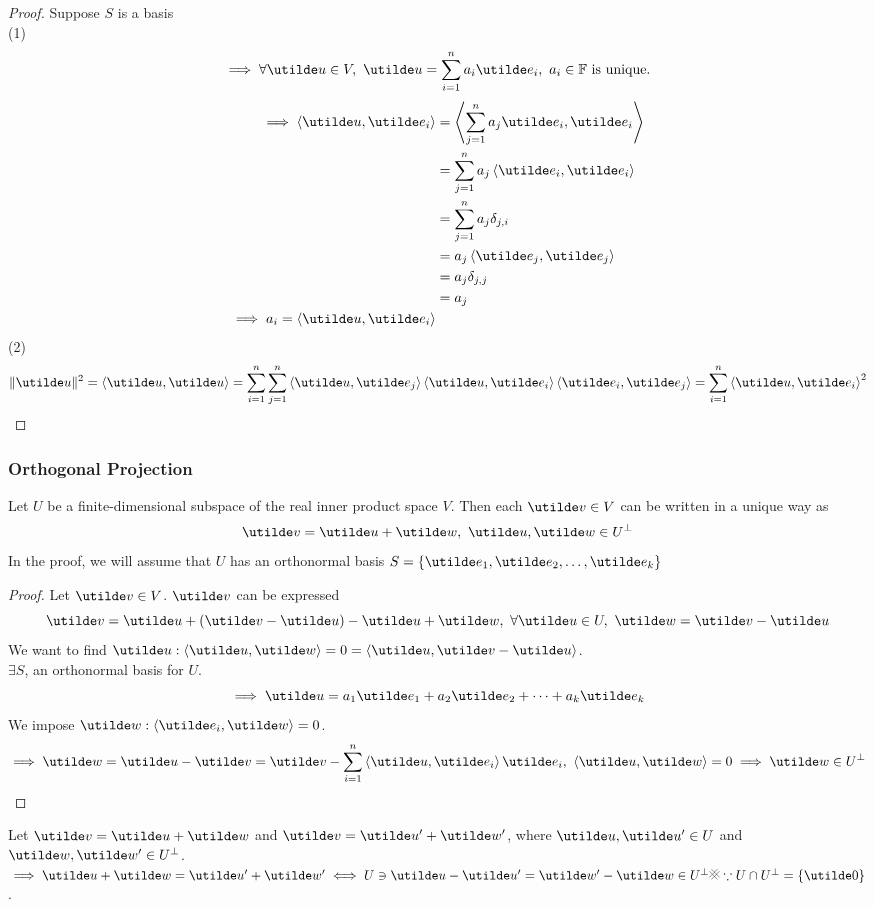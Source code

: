 \documentclass{report}
\begin{document}
\begin{proof}
  Suppose $S$ is a basis \\
  (1)
  $$
    \implies \forall \ut{u}\in V,\ \ut{u} = \sum_{i=1}^{n} a_i \ut{e}_i,\ a_i\in\bbf\ \text{is unique.}
  $$
  \begin{align*}
    \implies \brangle{\ut{u},\ut{e}_i} &= \brangle{\sum_{j=1}^{n} a_j \ut{e}_i, \ut{e}_i} \\
      &= \sum_{j=1}^{n} a_j\brangle{\ut{e}_i, \ut{e}_i} \\
      &= \sum_{j=1}^{n} a_j\delta_{j,i} \\
      &= a_j \brangle{\ut{e}_j, \ut{e}_j} \\
      &= a_j \delta_{j,j} \\
      &= a_j \\
    \implies a_i = \brangle{\ut{u}, \ut{e}_i}
  \end{align*}
  (2)
  $$
    \norm{\ut{u}}^2 = \brangle{\ut{u},\ut{u}} = \sum_{i=1}^{n}\sum_{j=1}^{n} \brangle{\ut{u},\ut{e}_j}\brangle{\ut{u},\ut{e}_i}\brangle{\ut{e}_i,\ut{e}_j} = \sum_{i=1}^{n}\brangle{\ut{u},\ut{e}_i}^2
  $$
\end{proof}


\subsubsection{Orthogonal Projection}
Let $U$ be a finite-dimensional subspace of the real inner product space $V$. Then each $\ut{v}\in V$ can be written in a unique way as
$$
  \ut{v} = \ut{u} + \ut{w},\ \ut{u},\ut{w}\in U^\perp
$$
In the proof, we will assume that $U$ has an orthonormal basis $S=\braces{\ut{e}_1,\ut{e}_2,\dots,\ut{e}_k}$
\begin{proof}
  Let $\ut{v}\in V$. $\ut{v}$ can be expressed
  $$
    \ut{v} = \ut{u} + (\ut{v} - \ut{u}) - \ut{u} + \ut{w},\ \forall \ut{u}\in U,\ \ut{w} = \ut{v}-\ut{u}
  $$
  We want to find $\ut{u}:\brangle{\ut{u},\ut{w}} = 0 = \brangle{\ut{u}, \ut{v} - \ut{u}}$. \\
  $\exists S$, an orthonormal basis for $U$.
  $$
    \implies \ut{u} = a_1\ut{e}_1 + a_2\ut{e}_2 + \dots + a_k\ut{e}_k
  $$
  We impose $\ut{w}:\brangle{\ut{e}_i, \ut{w}} = 0$.
  $$
    \implies \ut{w} = \ut{u} - \ut{v} = \ut{v} - \sum_{i=1}^{n}\brangle{\ut{u},\ut{e}_i}\ut{e}_i,\ \brangle{\ut{u},\ut{w}} = 0 \implies \ut{w} \in U^\perp
  $$
\end{proof}

Let $\ut{v} = \ut{u} + \ut{w}$ and $\ut{v} = \ut{u}' + \ut{w}'$, where $\ut{u},\ut{u}'\in U$ and $\ut{w},\ut{w}'\in U^\perp$. \\
$\implies\ut{u} + \ut{w} = \ut{u}' + \ut{w}' \iff U\ni\ut{u} - \ut{u}' = \ut{w}' - \ut{w} \in U^\perp \contra \because U\cap U^\perp = \braces{\ut{0}}$. \\
\end{document}
